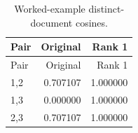 {\small\renewcommand{\arraystretch}{1.05}
\begin{longtable}{lrr}
\caption{Worked-example distinct-document cosines.}\\
\toprule
Pair & Original & Rank 1 \\ \midrule\endfirsthead
\toprule
Pair & Original & Rank 1 \\ \midrule\endhead
1,2 & 0.707107 & 1.000000 \\
1,3 & 0.000000 & 1.000000 \\
2,3 & 0.707107 & 1.000000 \\
\bottomrule
\end{longtable}
}
